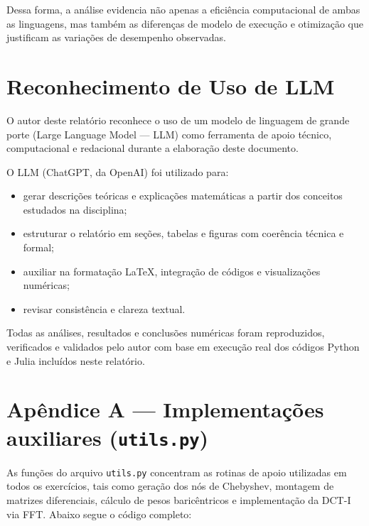 \documentclass[11pt,a4paper]{article}
\begin{document}
Dessa forma, a análise evidencia não apenas a eficiência computacional de ambas as linguagens,
mas também as diferenças de modelo de execução e otimização que justificam
as variações de desempenho observadas.


\section*{Reconhecimento de Uso de LLM}

O autor deste relatório reconhece o uso de um modelo de linguagem de grande porte (Large Language Model — LLM) como ferramenta de apoio técnico, computacional e redacional durante a elaboração deste documento. 

O LLM (ChatGPT, da OpenAI) foi utilizado para:
\begin{itemize}
  \item gerar descrições teóricas e explicações matemáticas a partir dos conceitos estudados na disciplina;
  \item estruturar o relatório em seções, tabelas e figuras com coerência técnica e formal;
  \item auxiliar na formatação \LaTeX, integração de códigos e visualizações numéricas;
  \item revisar consistência e clareza textual.
\end{itemize}

Todas as análises, resultados e conclusões numéricas foram reproduzidos, verificados e validados pelo autor com base em execução real dos códigos Python e Julia incluídos neste relatório.

\appendix
\section*{Apêndice A — Implementações auxiliares (\texttt{utils.py})}

As funções do arquivo \texttt{utils.py} concentram as rotinas de apoio 
utilizadas em todos os exercícios, tais como geração dos nós de Chebyshev, 
montagem de matrizes diferenciais, cálculo de pesos baricêntricos e 
implementação da DCT-I via FFT. Abaixo segue o código completo:


\end{document}
